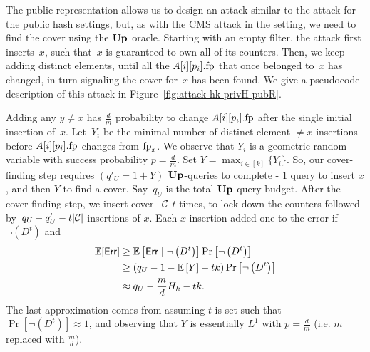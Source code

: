 \begin{figure*}[h]
	\caption[Private Hash and Public Representation Attack.]{Cover Set Attack for the HK in private
		hash function and public representation setting. 
		The attack is parametrized with  the update query budget $q_U$. The attack uses the function Get-t$(.)$ from Figure \ref{fig:attack-hk-hfis}.
	}
	\label{fig:attack-hk-privH-pubR}
\end{figure*}
The public representation allows us to design an attack similar to the attack for the public hash settings, but, as with the CMS attack in the setting, we need to find the cover using the $\textup{\textbf{Up}}\hspace{0.5pt}$ oracle.
Starting with an empty filter, the attack first inserts~$x$, such that~$x$ is guaranteed to own all of its counters. Then, we keep adding distinct elements, until all the $A[i][p_i].\textup{fp}$  that once belonged to~$x$ has changed, in turn signaling the cover for~$x$ has been found. We give a pseudocode description of this attack in Figure~\ref{fig:attack-hk-privH-pubR}.

Adding any $y \neq x$ has $\frac{d}{m}$ probability to change $A[i][p_i].\textup{fp}$ after the single initial insertion of~$x$. Let~$Y_i$ be the minimal number of distinct element $\neq x$ insertions before $A[i][p_i].\textup{fp}$ changes from $\textup{fp}_x$. We observe that $Y_i$ is a geometric random variable with success probability $p=\frac{d}{m}$. Set $Y=\max_{i \in [k]}\{Y_i\}$. So, our cover-finding step requires
$(q'_U  = 1+Y)$ $\textup{\textbf{Up}}\hspace{0.5pt}$-queries to complete - $1$ query to insert $x$, and then $Y$ to find a cover.
Say~$q_U$ is the total $\textup{\textbf{Up}}\hspace{0.5pt}$-query budget. After the cover finding step, we insert cover ~$\mathcal{C}$ $t$ times, to lock-down the counters followed by~$q_U - q_U' - t|\mathcal{C}|$ insertions of $x$. Each $x$-insertion added one to the error if $\lnot \left(D^t\right)$ and
\begin{align*}
	\mathbb{E}[\mathsf{Err}] &\geq \mathbb{E}\left[\mathsf{Err}  \mid \lnot \left(D^t\right)\right] \Pr\left[\lnot \left(D^t\right)\right] \\
	&\geq \left(q_U- 1- \mathbb{E}\left[Y \right] - tk\right)\Pr\left[\lnot \left(D^t\right)\right] \\
	&\approx q_U - \frac{m}{d} H_k-tk. 
\end{align*}
The last approximation comes from assuming $t$ is set such that $\Pr\left[\lnot \left(D^t\right)\right]\allowbreak \approx 1$, and observing that $Y$ is essentially $L^1$ with $p = \frac{d}{m}$ (i.e. $m$ replaced with $\frac{m}{d}$). 

